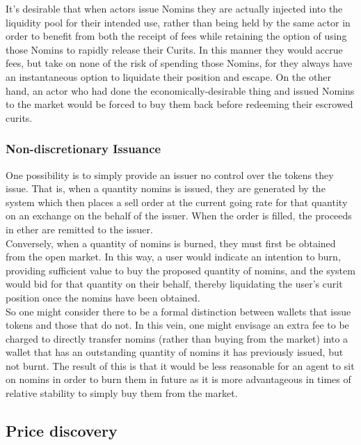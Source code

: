 \noindent It's desirable that when actors issue Nomins they are actually injected into the liquidity pool for their intended use,
rather than being held by the same actor in order to benefit from both the receipt of fees while retaining the option of using those Nomins to rapidly release their Curits.
In this manner they would accrue fees, but take on none of the risk of spending those Nomins, for they always have an instantaneous option to liquidate their position and escape.
On the other hand, an actor who had done the economically-desirable thing and issued Nomins to the market would be forced to buy them back before redeeming their escrowed curits.

\subsubsection{Non-discretionary Issuance}

One possibility is to simply provide an issuer no control over the tokens they issue. That is, when a quantity nomins is issued, they are generated by the system which then places a sell order at the current going rate for that quantity on an exchange on the behalf of the issuer. When the order is filled, the proceeds in ether are remitted to the issuer. \\

\noindent Conversely, when a quantity of nomins is burned, they must first be obtained from the open market. In this way, a user would indicate an intention to burn, providing sufficient value to buy the proposed quantity of nomins, and the system would bid for that quantity on their behalf, thereby liquidating the user's curit position once the nomins have been obtained. \\

\noindent So one might consider there to be a formal distinction between wallets that issue tokens and those that do not. In this vein, one might envisage an extra fee to be charged to directly transfer nomins (rather than buying from the market) into a wallet that has an outstanding quantity of nomins it has previously issued, but not burnt. The result of this is that it would be less reasonable for an agent to sit on nomins in order to burn them in future as it is more advantageous in times of relative stability to simply buy them from the market. \\

\pagebreak 

\subsection{Price discovery}

